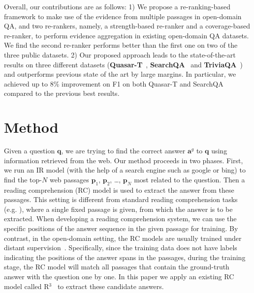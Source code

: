 \documentclass{article} \usepackage{iclr2018_conference,times}
\begin{document}
Overall, our contributions are as follows: 1) We propose a re-ranking-based framework to make use of the evidence from multiple passages in open-domain QA, and two re-rankers, namely, a strength-based re-ranker and a coverage-based re-ranker, to
perform evidence aggregation in existing open-domain QA datasets. We find the second re-ranker performs better than the first one on two of the three public datasets.
2) Our proposed approach leads to the state-of-the-art results on three different datasets (\textbf{Quasar-T}~\citep{dhingra2017quasar}, \textbf{SearchQA}~\citep{dunn2017searchqa} and \textbf{TriviaQA}~\citep{JoshiTriviaQA2017}) and outperforms previous state of the art by large margins. In particular, we achieved up to 8\% improvement on F1 on both Quasar-T and SearchQA compared to the previous best results. 







 
\section{Method}
Given a question $\mathbf{q}$, we are trying to find the correct answer $\mathbf{a}^g$ to $\mathbf{q}$ using information retrieved from the web. Our method proceeds in two phases.  First, we run an IR model (with the help of a search engine such as google or bing) to find the top-$N$ web passages $\mathbf{p}_1$, $\mathbf{p}_2$, \ldots, $\mathbf{p}_N$ most related to the question. Then a reading comprehension (RC) model is used to extract the answer from these passages.  This setting is different from standard reading comprehension tasks (e.g. \citep{rajpurkar2016squad}), where a single fixed passage is given, from which the answer is to be extracted.
When developing a reading comprehension system, we can use the specific positions of the answer sequence in the given passage for training.
By contrast, in the open-domain setting, the RC models are usually trained under distant supervision~\citep{chen2017reading,dhingra2017quasar,JoshiTriviaQA2017}. Specifically, since the training data does not have labels indicating the positions of the answer spans in the passages, during the training stage, the RC model will match all passages that contain the ground-truth answer with the question one by one.
In this paper we apply an existing RC model called R$^3$~\citep{wang2017r} to extract these candidate answers.
\end{document}
